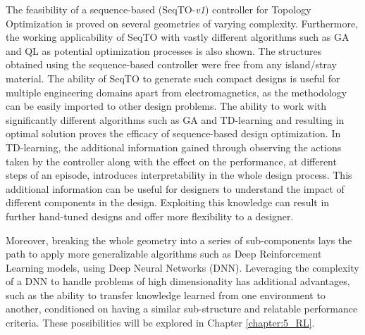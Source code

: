 The feasibility of a sequence-based (SeqTO-\textit{v1}) controller for Topology Optimization is proved on several geometries of varying complexity. Furthermore, the working applicability of SeqTO with vastly different algorithms such as GA and QL as potential optimization processes is also shown. The structures obtained using the sequence-based controller were free from any island/stray material. The ability of SeqTO to generate such compact designs is useful for multiple engineering domains apart from electromagnetics, as the methodology can be easily imported to other design problems. The ability to work with significantly different algorithms such as GA and TD-learning and resulting in optimal solution proves the efficacy of sequence-based design optimization.
In TD-learning, the additional information gained through observing the actions taken by the controller along with the effect on the performance, at different steps of an episode, introduces interpretability in the whole design process. This additional information can be useful for designers to understand the impact of different components in the design. Exploiting this knowledge can result in further hand-tuned designs and offer more flexibility to a designer.

Moreover, breaking the whole geometry into a series of sub-components lays the path to apply more generalizable algorithms such as Deep Reinforcement Learning models, using Deep Neural Networks (DNN). Leveraging the complexity of a DNN to handle problems of high dimensionality has additional advantages, such as the ability to transfer knowledge learned from one environment to another, conditioned on having a similar sub-structure and relatable performance criteria. These possibilities will be explored in Chapter \ref{chapter:5_RL}. 



